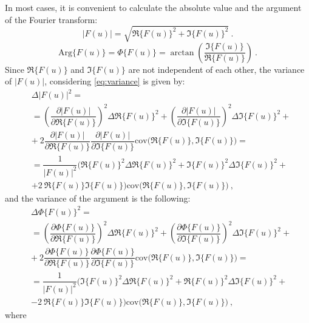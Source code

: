 \documentclass[a4paper,12pt,oneside]{article}
\newcommand{\Arg}{\Phi}
\begin{document}
In most cases, it is convenient to calculate the absolute value and the argument of the Fourier transform:
\begin{equation}\label{eq:abs1}
  |F(u)| = \sqrt{\Re\{F(u)\}^2 + \Im\{F(u)\}^2} \ .
\end{equation}
\begin{equation}\label{eq:arg1}
  \mathrm{Arg}\{F(u)\} = \Arg\{F(u)\} = \arctan\left(\dfrac{\Im\{F(u)\}}{\Re\{F(u)\}}\right) \ .
\end{equation}
Since $\Re\{F(u)\}$ and $\Im\{F(u)\}$ are not independent of each other, the variance of $|F(u)|$, considering \eqref{eq:variance} is given by:
\begin{eqnarray}\label{eq:abs_err}
  & \Delta |F(u)|^2 = \nonumber\\
  & = \left( \dfrac{\partial |F(u)|}{\partial \Re\{F(u)\}} \right)^2 \Delta \Re\{F(u)\}^2
  + \left( \dfrac{\partial |F(u)|}{\partial \Im\{F(u)\}} \right)^2 \Delta \Im\{F(u)\}^2 + \nonumber\\
  & +\ 2 \dfrac{\partial |F(u)|}{\partial \Re\{F(u)\}} \dfrac{\partial |F(u)|}{\partial \Im\{F(u)\}}
  \mathrm{cov} \Big( \Re\{F(u)\}, \Im\{F(u)\} \Big) = \nonumber\\
  & = \dfrac{1}{|F(u)|^2} \Big( \Re\{F(u)\}^2 \Delta \Re\{F(u)\}^2 + \Im\{F(u)\}^2 \Delta \Im\{F(u)\}^2  + \nonumber\\
  & + 2\ \Re\{F(u)\} \Im\{F(u)\} \Big) \mathrm{cov} \Big( \Re\{F(u)\}, \Im\{F(u)\} \Big) \ ,
\end{eqnarray}
and the variance of the argument is the following:
\begin{eqnarray}\label{eq:arg_err}
  & \Delta \Arg\{F(u)\}^2 = \nonumber\\
  & = \left( \dfrac{\partial \Arg\{F(u)\}}{\partial \Re\{F(u)\}} \right)^2 \Delta \Re\{F(u)\}^2
  + \left( \dfrac{\partial \Arg\{F(u)\}}{\partial \Im\{F(u)\}} \right)^2 \Delta \Im\{F(u)\}^2 + \nonumber\\
  & +\ 2 \dfrac{\partial \Arg\{F(u)\}}{\partial \Re\{F(u)\}} \dfrac{\partial \Arg\{F(u)\}}{\partial \Im\{F(u)\}}
  \mathrm{cov} \Big( \Re\{F(u)\}, \Im\{F(u)\} \Big) = \nonumber\\
  & = \dfrac{1}{|F(u)|^2} \Big( \Im\{F(u)\}^2 \Delta \Re\{F(u)\}^2 + \Re\{F(u)\}^2 \Delta \Im\{F(u)\}^2  + \nonumber\\
  & - 2\ \Re\{F(u)\} \Im\{F(u)\} \Big) \mathrm{cov} \Big( \Re\{F(u)\}, \Im\{F(u)\} \Big) \ ,
\end{eqnarray}
where
\end{document}

